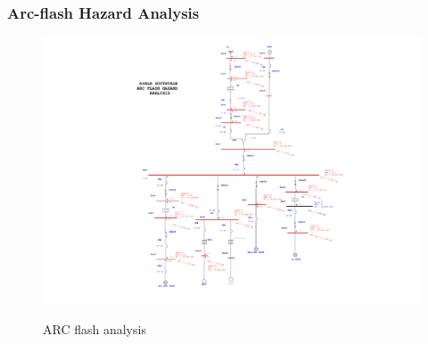 \subsubsection{Arc-flash Hazard Analysis }
\begin{figure}
	\includegraphics[width=\textwidth]{figures/fig_ch04_elecaudit_Arc_Flash_Analysis.pdf} \\
	\caption{ARC flash analysis}
	\label{fig_ch04_elecaudit_ARC1_SLD_Arc_Flash_Analysis} 
\end{figure}


